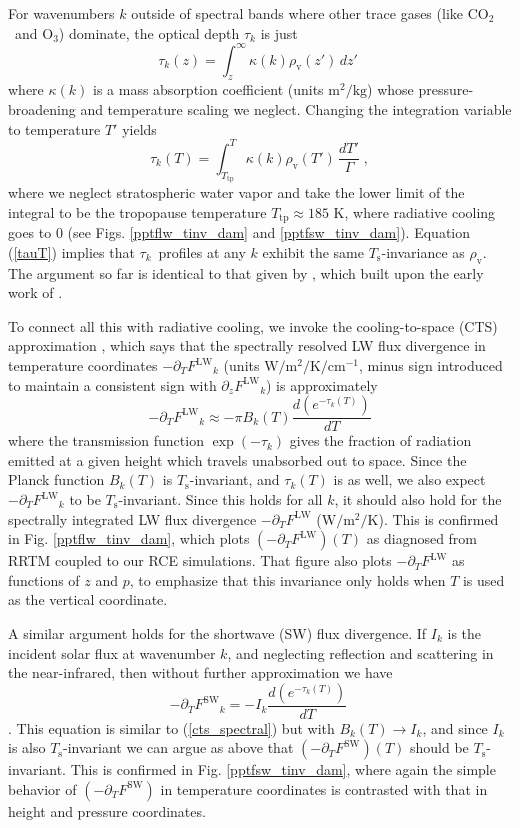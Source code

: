 \documentclass[10pt]{article}
\newcommand{\beqn}{\begin{equation}}
\newcommand{\eeqn}{\end{equation}}
\newcommand{\eqnref}[1]{(\ref{#1})}
\newcommand{\der}[2]{\ensuremath{\frac{d #1}{d #2}}}
\newcommand{\ppz}{\ensuremath{\partial_z}}
\newcommand{\ppt}{\ensuremath{\partial_T}}
\newcommand{\cotwo}{\ensuremath{\mathrm{CO_2}}}
\newcommand{\othree}{\ensuremath{\mathrm{O_3}}}
\newcommand{\FLW}{\ensuremath{F^\mathrm{LW}}}
\newcommand{\FSW}{\ensuremath{F^\mathrm{SW}}}
\newcommand{\cminverse}{\ensuremath{\mathrm{cm^{-1}}}}
\newcommand{\tauk}{\ensuremath{\tau_k}}
\newcommand{\Wmsq}{\ensuremath{\mathrm{W/m^2}}}
\newcommand{\rhov}{\ensuremath{\rho_\mathrm{v}}}
\newcommand{\Ts}{\ensuremath{T_\mathrm{s}}}
\newcommand{\Ttp}{\ensuremath{T_\mathrm{tp}}}
\begin{document}
	For wavenumbers $k$ outside of spectral bands where other trace gases (like \cotwo\ and \othree) dominate, the optical depth $\tauk$ is just
	\beqn
		\tau_k(z) = \int_z^\infty \kappa(k)  \rhov(z') \, dz'  \; 
		\label{tauz}
	\eeqn
		where $\kappa(k)$ is a  mass absorption coefficient  (units $\mathrm{m^2/kg}$) whose pressure-broadening and temperature scaling we neglect. Changing the integration variable to temperature $T'$ yields
		\beqn
		\tau_k(T) = \int_{\Ttp}^T \kappa(k)  \rhov(T') \, \frac{dT'}{\Gamma}  \; ,
		\label{tauT}
	\eeqn
	where we neglect stratospheric water vapor and take the lower limit of the integral to be the tropopause temperature $\Ttp \approx 185$ K, where radiative cooling goes to 0 (see Figs. \ref{pptflw_tinv_dam} and  \ref{pptfsw_tinv_dam}).  Equation \eqnref{tauT} implies that \tauk\ profiles at any $k$ exhibit the same \Ts-invariance as \rhov. The argument so far is identical to that given by \cite{ingram2010}, which built upon the early work of \cite{simpson1928}.
	
	To connect all this with radiative cooling, we invoke the cooling-to-space (CTS) approximation \citep{jeevanjee2016,thomas2002}, which says that the spectrally resolved LW flux divergence in temperature coordinates $-\ppt \FLW_k$ (units $\Wmsq/\mathrm{K}/\cminverse$, minus sign introduced to maintain a consistent sign with  $\ppz \FLW_k$) is approximately
	\beqn
		-\ppt \FLW_k \approx - \pi B_k(T) \frac{d (e^{-\tauk(T)})}{dT}
	\label{cts_spectral}
	\eeqn
where  the transmission function $\exp(-\tauk)$ gives the fraction of radiation emitted at a given height which travels unabsorbed out to space. Since the Planck function $B_k(T)$ is \Ts-invariant, and $\tauk(T)$ is as well, we also expect $-\ppt \FLW_k$ to be \Ts-invariant. Since this holds for all $k$, it should also hold for the spectrally integrated LW flux divergence $-\ppt \FLW$ ($\Wmsq/\mathrm{K}$). This is confirmed in 
 Fig.  \ref{pptflw_tinv_dam}, which plots $(-\ppt \FLW)(T)$ as diagnosed from RRTM coupled to our  RCE simulations.  That figure also plots $-\ppt \FLW$ as functions of $z$ and $p$, to emphasize that this invariance only holds  when $T$ is used as the vertical coordinate.
	
	A similar argument holds for the shortwave (SW) flux divergence. If $I_k$ is the incident solar flux at wavenumber $k$, and  neglecting reflection and scattering in the  near-infrared, 
then without further approximation we have
	\beqn
		-\ppt \FSW_k = - I_k \der{(e^{-\tauk(T)})}{T}
		\
	\eeqn
\citep[c.f.][eqn. 9.26]{thomas2002}. This equation is similar to  \eqnref{cts_spectral} but with $B_k(T) \rightarrow I_k$, and since $I_k$ is also \Ts-invariant we can argue as above that $(-\ppt \FSW)(T)$ should be \Ts-invariant. This is confirmed in Fig. \ref{pptfsw_tinv_dam}, where again the simple behavior of $(-\ppt \FSW)$ in temperature coordinates is contrasted with that in height and pressure coordinates.
\end{document}

